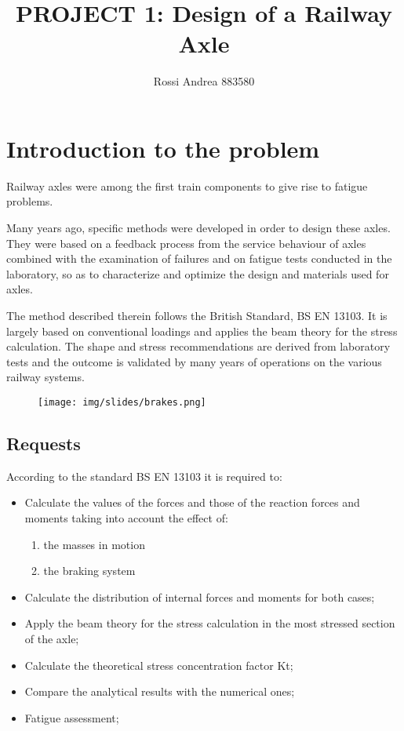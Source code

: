 \documentclass[a4paper,12pt]{article}
\title{PROJECT 1: Design of a Railway Axle}
\author{Rossi Andrea 883580}
\date{}
\begin{document}
\maketitle

\section{Introduction to the problem}
Railway axles were among the first train components to give rise to fatigue problems.

Many years ago, specific methods were developed in order to design these axles. They were based on a feedback process from the service behaviour of axles combined with the examination of failures and on fatigue tests conducted in the laboratory, so as to characterize and optimize the design and materials used for axles.

The method described therein follows the British Standard, BS EN
13103. It is largely based on conventional loadings and applies the
beam theory for the stress calculation. The shape and stress
recommendations are derived from laboratory tests and the
outcome is validated by many years of operations on the various
railway systems.

\begin{figure}[H]
\centering
\texttt{[image: img/slides/brakes.png]}
\label{brakes}
\end{figure}

\subsection*{Requests}
According to the standard BS EN 13103 it is required to:
\begin{itemize}
\item Calculate the values of the forces and those of the reaction forces and moments
taking into account the effect of:
\begin{enumerate}
\item the masses in motion
\item the braking system
\end{enumerate}
\item Calculate the distribution of internal forces and moments for both cases;
\item Apply the beam theory for the stress calculation in the most stressed section of the axle;
\item Calculate the theoretical stress concentration factor Kt;
\item Compare the analytical results with the numerical ones;
\item Fatigue assessment;
\end{itemize}
\end{document}
